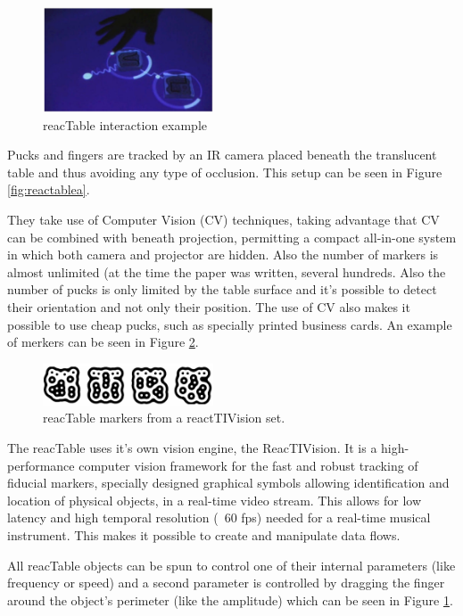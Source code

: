 \begin{figure}
\centering
\includegraphics[width=0.45\textwidth]{figures/reactable2.jpg}
\caption{reacTable interaction example}
\label{fig:reactableb}
\end{figure}

Pucks and fingers are tracked by an IR camera placed beneath the translucent table and thus avoiding any type of occlusion. This setup can be seen in Figure \ref{fig:reactablea}.

They take use of Computer Vision (CV) techniques, taking advantage that CV can be combined with beneath projection, permitting a compact all-in-one system in which both camera and projector are hidden. Also the number of markers is almost unlimited (at the time the paper was written, several hundreds. 
Also the number of pucks is only limited by the table surface and it's possible to detect their orientation and not only their position. 
The use of CV also makes it possible to use cheap pucks, such as specially printed business cards. An example of merkers can be seen in Figure \ref{fig:reactable2}.

\begin{figure}
\centering
\includegraphics[width=0.45\textwidth]{figures/reactable-amoebamarkers.jpg}
\caption{reacTable markers from a reactTIVision set.}
\label{fig:reactable2}
\end{figure}

The reacTable uses it's own vision engine, the ReacTIVision. It is a high-performance computer vision framework for the fast and robust tracking of fiducial markers, specially designed graphical symbols allowing identification and location of physical objects, in a real-time video stream. This allows for low latency and high temporal resolution (~60 fps) needed for a real-time musical instrument. 
This makes it possible to create and manipulate data flows. 

All reacTable objects can be spun to control one of their internal parameters (like frequency or speed) and a second parameter is controlled by dragging the finger around the object's perimeter (like the amplitude) which can be seen in Figure \ref{fig:reactableb}.

